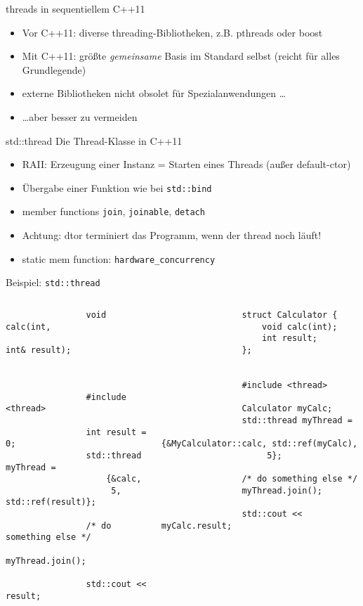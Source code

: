 \begin{frame}{threads in sequentiellem C++11}
	\begin{itemize}
		\item Vor C++11: diverse threading-Bibliotheken, z.B. pthreads oder boost
		\item Mit C++11: größte \emph{gemeinsame} Basis im Standard selbst (reicht für alles Grundlegende)
		\item externe Bibliotheken nicht obsolet für Spezialanwendungen \dots
		\item \dots aber besser zu vermeiden
	\end{itemize}
	
	\pause
	
	\begin{block}{std::thread}
		Die Thread-Klasse in C++11
		\begin{itemize}
			\item RAII: Erzeugung einer Instanz = Starten eines Threads (außer default-ctor)
			\item Übergabe einer Funktion wie bei \texttt{std::bind}
			\item member functions \texttt{join}, \texttt{joinable}, \texttt{detach}
			\item Achtung: dtor terminiert das Programm, wenn der thread noch läuft!
			\item static mem function: \texttt{hardware\_concurrency}
		\end{itemize}
	\end{block}
\end{frame}

\begin{frame}[fragile]{Beispiel: \texttt{std::thread}}
	\begin{columns}[b]
			\begin{lstlisting}
				void calc(int,
				          int& result);
				
				
				
				#include <thread>
				
				int result = 0;
				std::thread myThread =
					{&calc,
					 5, std::ref(result)};
					 
				/* do something else */
				myThread.join();
				
				std::cout << result;
			\end{lstlisting}
		
		\pause
		
			\begin{lstlisting}
				struct Calculator {
					void calc(int);
					int result;
				};
				
				
				#include <thread>
				
				Calculator myCalc;
				std::thread myThread =
					{&MyCalculator::calc, std::ref(myCalc),
					 5};
				
				/* do something else */
				myThread.join();
				
				std::cout << myCalc.result;
			\end{lstlisting}
	\end{columns}
\end{frame}

